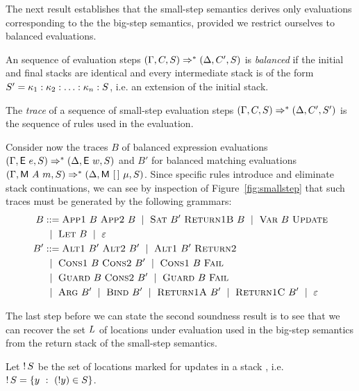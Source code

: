   The next result establishes that the small-step semantics
  derives only evaluations corresponding to the
  the big-step semantics, provided we restrict ourselves
  to balanced evaluations.

  \begin{definition}
    An sequence of evaluation steps
    $(\Gamma,C,S) \Rightarrow^{*}
    (\Delta,C',S)$ is \emph{balanced} if
    the initial and final stacks are identical and every intermediate
    stack is of the form $S' = \kappa_1:\kappa_2:\ldots:\kappa_n:S$, i.e.\@
    an extension of the initial stack.
  \end{definition}

  \begin{definition}
    The \emph{trace} of a sequence of small-step evaluation
    steps $(\Gamma,C,S) \Rightarrow^{*}
    (\Delta,C',S')$ is the sequence of rules used in the evaluation.
  \end{definition}

  Consider now the traces $B$ of balanced expression evaluations
  $(\Gamma,\textsf{E}~e,S)\Rightarrow^{*}(\Delta,\textsf{E}~w,S)$
  and $B'$ for balanced matching evaluations
  $(\Gamma,\textsf{M}~A~m,S)\Rightarrow^{*}(\Delta,\textsf{M}~[\,]~\mu,S)$. Since
  specific rules introduce and eliminate stack continuations, we can
  see by inspection of Figure~\ref{fig:smallstep} that such traces
  must be generated by the following grammars:
\begin{align}
  B &::= \textsc{App1}~ B~ \textsc{App2}~B ~\mid~
      \textsc{Sat}~B'~ \textsc{Return1B}~B
      ~\mid~ \textsc{Var}~B ~ \textsc{Update} \notag \\
  &~\mid~ \textsc{Let}~B ~\mid~ \varepsilon  \label{eq:bal-expr}\\
  B' &::= \textsc{Alt1}~B'~\textsc{Alt2}~B' ~\mid~
       \textsc{Alt1}~B'~\textsc{Return2} \notag \\
    &~\mid~ \textsc{Cons1}~ B ~\textsc{Cons2}~B' ~\mid~
      \textsc{Cons1}~ B~ \textsc{Fail} \notag \\
    & ~\mid~ \textsc{Guard}~ B ~\textsc{Cons2}~B' ~\mid~
      \textsc{Guard}~ B~ \textsc{Fail}\notag \\
    &~\mid~ \textsc{Arg}~ B' ~\mid~ \textsc{Bind}~B' 
      ~\mid~ \textsc{Return1A}~B' ~\mid~ \textsc{Return1C}~B' ~\mid~ \varepsilon
      \label{eq:bal-matching}
\end{align}

The last step before we can state the second soundness result is
to see that we can recover the set $L$ of locations under evaluation
used in the big-step semantics from the return stack of the small-step
semantics.
\begin{definition}
  Let $\mathop{!}{S}$
  be the set of locations marked
  for updates in a stack \retstack, i.e.\@
  $\mathop{!}{S} = \{ y ~:~ (!y) \in S \}$.
\end{definition}

